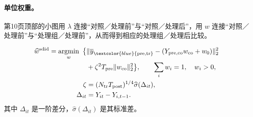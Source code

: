 \paragraph{单位权重。}
第10页顶部的小图用 \(\lambda\) 连接“对照／处理前”与“对照／处理后”，用 \(w\) 连接“对照／处理前”与“处理组／处理前”，从而得到相应的处理组／处理后比较。
\begin{center}
\end{center}
\begin{align*}
\widehat w^{\mathrm{sdid}}
=\operatorname*{argmin}_{w}\ \big\{
&\|\overline y_{\textcolor{blue}{\mathrm{pre,tr}}}
-(Y_{\mathrm{pre,co}}w_{\mathrm{co}}+w_0)\|_2^2\\
&+\zeta^2T_{\mathrm{pre}}\|w_{\mathrm{co}}\|_2^2\big\},
\qquad \sum_iw_i=1,\quad w_i>0,\\
\zeta&=(N_{\mathrm{tr}}T_{\mathrm{post}})^{1/4}
\widehat\sigma(\Delta_{it}),\\
\Delta_{it}&=Y_{it}-Y_{i,t-1}.
\end{align*}
其中 \(\Delta_{it}\) 是一阶差分，\(\widehat\sigma(\Delta_{it})\) 是其标准差。

